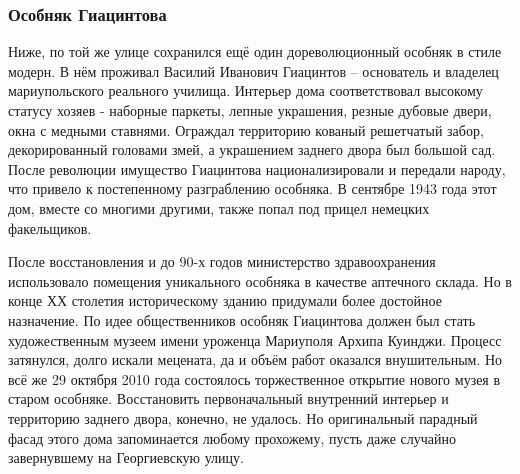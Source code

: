  
 
 
 
 

\subsubsection{Особняк Гиацинтова}

Ниже, по той же улице сохранился ещё один дореволюционный особняк в стиле
модерн. В нём проживал Василий Иванович Гиацинтов – основатель и владелец
мариупольского реального училища. Интерьер дома соответствовал высокому статусу
хозяев - наборные паркеты, лепные украшения, резные дубовые двери, окна с
медными ставнями. Ограждал территорию кованый решетчатый забор, декорированный
головами змей, а украшением заднего двора был большой сад. После революции
имущество Гиацинтова национализировали и передали народу, что привело к
постепенному разграблению особняка. В сентябре 1943 года этот дом, вместе со
многими другими, также попал под прицел немецких факельщиков.


После восстановления и до 90-х годов министерство здравоохранения использовало
помещения уникального особняка в качестве аптечного склада. Но в конце ХХ
столетия историческому зданию придумали более достойное назначение. По идее
общественников особняк Гиацинтова должен был стать художественным музеем имени
уроженца Мариуполя Архипа Куинджи. Процесс затянулся, долго искали мецената, да
и объём работ оказался внушительным. Но всё же 29 октября 2010 года состоялось
торжественное открытие нового музея в старом особняке. Восстановить
первоначальный внутренний интерьер и территорию заднего двора, конечно, не
удалось. Но оригинальный парадный фасад этого дома запоминается любому
прохожему, пусть даже случайно завернувшему на Георгиевскую улицу.

